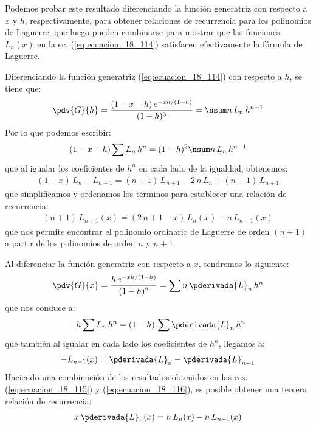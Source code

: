 Podemos probar este resultado diferenciando la función generatriz con respecto a $x$ y $h$, respectivamente, para obtener relaciones de recurrencia para los polinomios de Laguerre, que luego pueden combinarse para mostrar que las funciones $L_{n} (x)$ en la ec. (\ref{eq:ecuacion_18_114}) satisfacen efectivamente la fórmula de Laguerre.
\par
Diferenciando la función generatriz (\ref{eq:ecuacion_18_114}) con respecto a $h$, se tiene que:
\begin{align*}
\pdv{G}{h} = \dfrac{(1 - x -h) \, e^{-xh/(1-h)}}{(1- h )^{3}} = \nsum n \, L_{n} \, h^{n-1}
\end{align*}
Por lo que podemos escribir:
\begin{align*}
(1 - x - h) \sum L_{n} \, h^{n} = (1 - h)^{2} \nsum n \, L_{n} \, h^{n-1}
\end{align*}
que al igualar los coeficientes de $h^{n}$ en cada lado de la igualdad, obtenemos:
\begin{align*}
(1 - x) \, L_{n} - L_{n-1} = (n + 1) \, L_{n+1} - 2 \, n \, L_{n} + (n + 1) \, L_{n+1}
\end{align*}
que simplificamos y ordenamos los términos para establecer una relación de recurrencia:
\begin{align}
(n + 1) \, L_{n+1} (x) = (2 \, n + 1 - x) \, L_{n}(x) - n \, L_{n-1} (x)
\label{eq:ecuacion_18_115}
\end{align}
que nos permite encontrar el polinomio ordinario de Laguerre de orden $(n+1)$ a partir de los polinomios de orden $n$ y $n+1$.
\par
Al diferenciar la función generatriz con respecto a $x$, tendremos lo siguiente:
\begin{align*}
\pdv{G}{x} = \dfrac{h \, e^{-xh/(1-h)}}{(1 - h)^{2}} = \sum n \, \pderivada{L}_{n} \, h^{n}
\end{align*}
que nos conduce a:
\begin{align*}
- h \sum L_{n} \, h^{n} =  (1 - h) \, \sum \pderivada{L}_{n} \, h^{n}
\end{align*}
que también al igualar en cada lado los coeficientes de $h^{n}$, llegamos a:
\begin{align}
- L_{n-1} (x) = \pderivada{L}_{n} - \pderivada{L}_{n-1}
\label{eq:ecuacion_18_116}
\end{align}
Haciendo una combinación de los resultados obtenidos en las ecs. (\ref{eq:ecuacion_18_115}) y (\ref{eq:ecuacion_18_116}), es posible obtener una tercera relación de recurrencia:
\begin{align}
x \, \pderivada{L}_{n} (x) = n \, L_{n} (x) - n \, L_{n-1} (x)
\label{eq:ecuacion_18_117}
\end{align}


